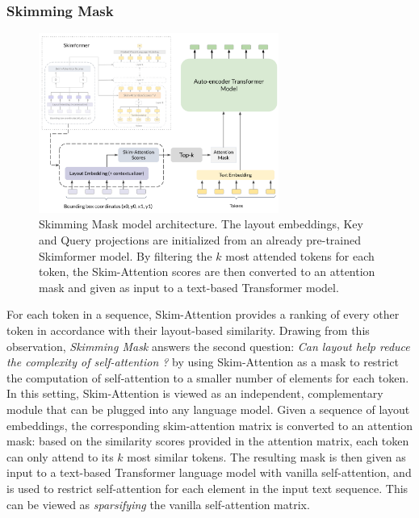\subsubsection{Skimming Mask}

\begin{figure}
    \centering
    \includegraphics[width=0.7\textwidth]{images/chapter3/skimmingmask-architecture.pdf}
    \caption{Skimming Mask model architecture. The layout embeddings, Key and Query projections are initialized from an already pre-trained Skimformer model. By filtering the $k$ most attended tokens for each token, the Skim-Attention scores are then converted to an attention mask and given as input to a text-based Transformer model.}
    \label{fig:chapter3-skimmingmask-architecture}
\end{figure}

For each token in a sequence, Skim-Attention provides a ranking of every other token in accordance with their layout-based similarity. Drawing from this observation, \emph{Skimming Mask} answers the second question: \textit{Can layout help reduce the complexity of self-attention ?} by using Skim-Attention as a mask to restrict the computation of self-attention to a smaller number of elements for each token. In this setting, Skim-Attention is viewed as an independent, complementary module that can be plugged into any language model. Given a sequence of layout embeddings, the corresponding skim-attention matrix is converted to an attention mask: based on the similarity scores provided in the attention matrix, each token can only attend to its $k$ most similar tokens. The resulting mask is then given as input to a text-based Transformer language model with vanilla self-attention, and is used to restrict self-attention for each element in the input text sequence. This can be viewed as \emph{sparsifying} the vanilla self-attention matrix.

